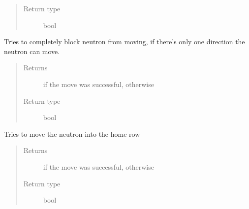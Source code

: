 \documentclass[letterpaper,10pt,english,openany,oneside]{sphinxmanual}
\begin{document}
\begin{fulllineitems}
\begin{fulllineitems}
\begin{quote}
\begin{description}
\item[{Return type}] \leavevmode
bool

\end{description}\end{quote}

\end{fulllineitems}


\begin{fulllineitems}
\label{\detokenize{player:player.StrategyPlayer.block_neutron}}
Tries to completely block neutron from moving, if there’s only one
direction the neutron can move.
\begin{quote}\begin{description}
\item[{Returns}] \leavevmode
{} if the move was successful,  otherwise

\item[{Return type}] \leavevmode
bool

\end{description}\end{quote}

\end{fulllineitems}


\begin{fulllineitems}
\label{\detokenize{player:player.StrategyPlayer.move_into_home}}
Tries to move the neutron into the home row
\begin{quote}\begin{description}
\item[{Returns}] \leavevmode
{} if the move was successful,  otherwise

\item[{Return type}] \leavevmode
bool

\end{description}\end{quote}

\end{fulllineitems}


\end{fulllineitems}
\end{document}
